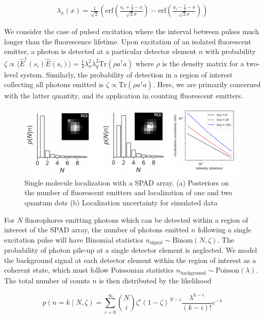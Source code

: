 \documentclass[a4paper, twocolumn, superscriptaddress,prl]{revtex4}  %
\begin{document}
\begin{align*}
\lambda_{x}(x) = \frac{1}{\sqrt{2}}\left(\mathrm{erf}\left(\frac{u_i+\frac{1}{2}-x}{\sqrt{2}\sigma}\right) -\mathrm{erf}\left(\frac{u_i-\frac{1}{2}-x}{\sqrt{2}\sigma}\right)\right)
\end{align*}

We consider the case of pulsed excitation where the interval between pulses much longer than the fluorescence lifetime. Upon excitation of an isolated fluorescent emitter, a photon is detected at a particular detector element $n$ with probability $\zeta\propto \langle \hat{E}^{\dagger}(s_i)\hat{E}(s_i)\rangle = \frac{1}{4}\lambda_{x}^2 \lambda_{y}^2\mathrm{Tr}(\rho a^{\dagger}a)$ where $\rho$ is the density matrix for a two-level system. Similarly, the probability of detection in a region of interest collecting all photons emitted is $\zeta\propto \mathrm{Tr}(\rho a^{\dagger}a)$. Here, we are primarily concerned with the latter quantity, and its application in counting fluorescent emitters.

\begin{figure}
\includegraphics[width=15cm]{Figure-4.png}
\caption{Single molecule localization with a SPAD array. (a) Posteriors on the number of fluorescent emitters and localization of one and two quantum dots (b) Localization uncertainty for simulated data}
\end{figure}   

For $N$ fluorophores emitting photons which can be detected within a region of interest of the SPAD array, the number of photons emitted $n$ following a single excitation pulse will have Binomial statistics $n_{\mathrm{signal}} \sim \mathrm{Binom}(N,\zeta)$. The probability of photon pile-up at a single detector element is neglected. We model the background signal at each detector element within the region of interest as a coherent state, which must follow Poissonian statistics $n_{\mathrm{background}} \sim \mathrm{Poisson}(\lambda)$. The total number of counts $n$ is then distributed by the likelihood

\begin{equation}
p(n=k \mid N, \zeta) = \sum_{i=0}^{\infty} \binom{N}{i} \zeta^i (1-\zeta)^{N-i} \frac{\lambda^{k-i}}{(k-i)!} e^{-\lambda}
\end{equation}
\end{document}
